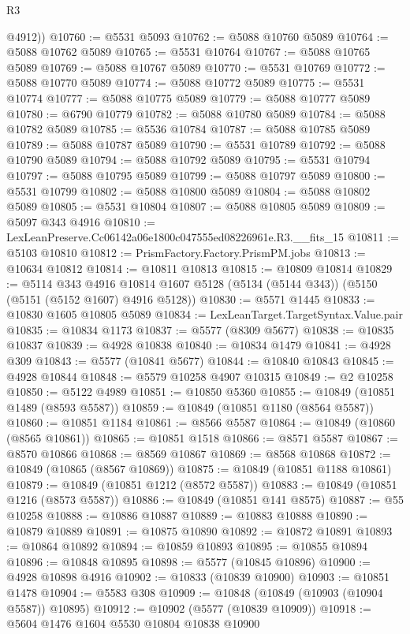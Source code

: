 \begin{lexlean}{R3}
\begin{coremodule}
        @4912))
@10760 := @5531 @5093
@10762 := @5088 @10760 @5089
@10764 := @5088 @10762 @5089
@10765 := @5531 @10764
@10767 := @5088 @10765 @5089
@10769 := @5088 @10767 @5089
@10770 := @5531 @10769
@10772 := @5088 @10770 @5089
@10774 := @5088 @10772 @5089
@10775 := @5531 @10774
@10777 := @5088 @10775 @5089
@10779 := @5088 @10777 @5089
@10780 := @6790 @10779
@10782 := @5088 @10780 @5089
@10784 := @5088 @10782 @5089
@10785 := @5536 @10784
@10787 := @5088 @10785 @5089
@10789 := @5088 @10787 @5089
@10790 := @5531 @10789
@10792 := @5088 @10790 @5089
@10794 := @5088 @10792 @5089
@10795 := @5531 @10794
@10797 := @5088 @10795 @5089
@10799 := @5088 @10797 @5089
@10800 := @5531 @10799
@10802 := @5088 @10800 @5089
@10804 := @5088 @10802 @5089
@10805 := @5531 @10804
@10807 := @5088 @10805 @5089
@10809 := @5097 @343 @4916
@10810 := LexLeanPreserve.Cc06142a06e1800c047555ed08226961e.R3.__fits_15
@10811 := @5103 @10810
@10812 := PrismFactory.Factory.PrismPM.jobs
@10813 := @10634 @10812
@10814 := @10811 @10813
@10815 := @10809 @10814
@10829 := @5114
    @343
    @4916
    @10814
    @1607
    @5128
    (@5134 (@5144 @343))
    (@5150 (@5151 (@5152 @1607) @4916 @5128))
@10830 := @5571 @1445
@10833 := @10830 @1605 @10805 @5089
@10834 := LexLeanTarget.TargetSyntax.Value.pair
@10835 := @10834 @1173
@10837 := @5577 (@8309 @5677)
@10838 := @10835 @10837
@10839 := @4928 @10838
@10840 := @10834 @1479
@10841 := @4928 @309
@10843 := @5577 (@10841 @5677)
@10844 := @10840 @10843
@10845 := @4928 @10844
@10848 := @5579 @10258 @4907 @10315
@10849 := @2 @10258
@10850 := @5122 @4989
@10851 := @10850 @5360
@10855 := @10849 (@10851 @1489 (@8593 @5587))
@10859 := @10849 (@10851 @1180 (@8564 @5587))
@10860 := @10851 @1184
@10861 := @8566 @5587
@10864 := @10849 (@10860 (@8565 @10861))
@10865 := @10851 @1518
@10866 := @8571 @5587
@10867 := @8570 @10866
@10868 := @8569 @10867
@10869 := @8568 @10868
@10872 := @10849 (@10865 (@8567 @10869))
@10875 := @10849 (@10851 @1188 @10861)
@10879 := @10849 (@10851 @1212 (@8572 @5587))
@10883 := @10849 (@10851 @1216 (@8573 @5587))
@10886 := @10849 (@10851 @141 @8575)
@10887 := @55 @10258
@10888 := @10886 @10887
@10889 := @10883 @10888
@10890 := @10879 @10889
@10891 := @10875 @10890
@10892 := @10872 @10891
@10893 := @10864 @10892
@10894 := @10859 @10893
@10895 := @10855 @10894
@10896 := @10848 @10895
@10898 := @5577 (@10845 @10896)
@10900 := @4928 @10898 @4916
@10902 := @10833 (@10839 @10900)
@10903 := @10851 @1478
@10904 := @5583 @308
@10909 := @10848 (@10849 (@10903 (@10904 @5587)) @10895)
@10912 := @10902 (@5577 (@10839 @10909))
@10918 := @5604 @1476 @1604 @5530 @10804 @10838 @10900

\end{coremodule}
\end{lexlean}
